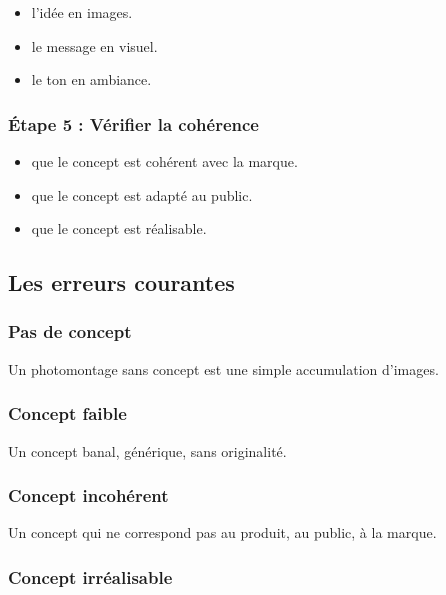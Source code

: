 \begin{itemize}
    \item {} l'idée en images.
    \item {} le message en visuel.
    \item {} le ton en ambiance.
\end{itemize}

\subsubsection{Étape 5 : Vérifier la cohérence}

\begin{itemize}
    \item {} que le concept est cohérent avec la marque.
    \item {} que le concept est adapté au public.
    \item {} que le concept est réalisable.
\end{itemize}

\subsection{Les erreurs courantes}

\subsubsection{Pas de concept}

Un photomontage sans concept est une simple accumulation d'images.

\subsubsection{Concept faible}

Un concept banal, générique, sans originalité.

\subsubsection{Concept incohérent}

Un concept qui ne correspond pas au produit, au public, à la marque.

\subsubsection{Concept irréalisable}

